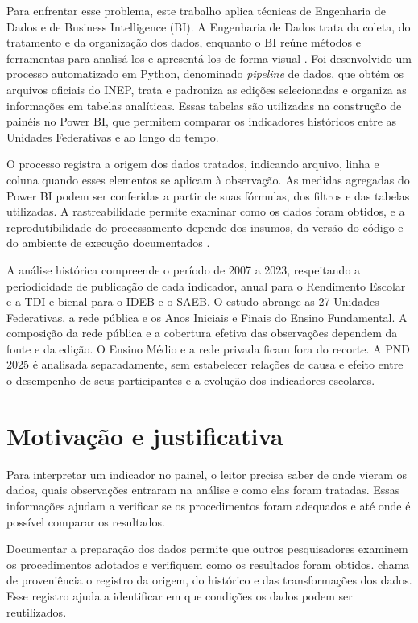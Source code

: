 Para enfrentar esse problema, este trabalho aplica técnicas de Engenharia de Dados e de Business Intelligence (BI). A Engenharia de Dados trata da coleta, do tratamento e da organização dos dados, enquanto o BI reúne métodos e ferramentas para analisá-los e apresentá-los de forma visual \cite{carvalho2025estudo,loh2014bi}. Foi desenvolvido um processo automatizado em Python, denominado \textit{pipeline} de dados, que obtém os arquivos oficiais do INEP, trata e padroniza as edições selecionadas e organiza as informações em tabelas analíticas. Essas tabelas são utilizadas na construção de painéis no Power BI, que permitem comparar os indicadores históricos entre as Unidades Federativas e ao longo do tempo.

O processo registra a origem dos dados tratados, indicando arquivo, linha e coluna quando esses elementos se aplicam à observação. As medidas agregadas do Power BI podem ser conferidas a partir de suas fórmulas, dos filtros e das tabelas utilizadas. A rastreabilidade permite examinar como os dados foram obtidos, e a reprodutibilidade do processamento depende dos insumos, da versão do código e do ambiente de execução documentados \cite{da2025proveniencia,ferreira2024dados}.

A análise histórica compreende o período de 2007 a 2023, respeitando a periodicidade de publicação de cada indicador, anual para o Rendimento Escolar e a TDI e bienal para o IDEB e o SAEB. O estudo abrange as 27 Unidades Federativas, a rede pública e os Anos Iniciais e Finais do Ensino Fundamental. A composição da rede pública e a cobertura efetiva das observações dependem da fonte e da edição. O Ensino Médio e a rede privada ficam fora do recorte. A PND 2025 é analisada separadamente, sem estabelecer relações de causa e efeito entre o desempenho de seus participantes e a evolução dos indicadores escolares.

\section{Motivação e justificativa}

Para interpretar um indicador no painel, o leitor precisa saber de onde vieram os dados, quais observações entraram na análise e como elas foram tratadas. Essas informações ajudam a verificar se os procedimentos foram adequados e até onde é possível comparar os resultados.

Documentar a preparação dos dados permite que outros pesquisadores examinem os procedimentos adotados e verifiquem como os resultados foram obtidos.  chama de proveniência o registro da origem, do histórico e das transformações dos dados. Esse registro ajuda a identificar em que condições os dados podem ser reutilizados.


